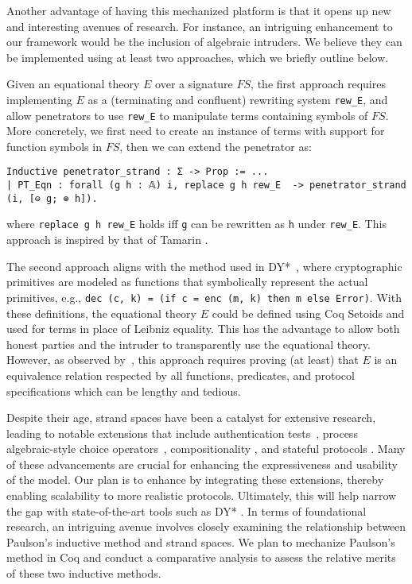 Another advantage of having this mechanized platform is that it opens up new and interesting avenues of research.
\ifdefined\COLORDIFF
    \color{cbred}
\else
\fi
For instance, an intriguing enhancement to our framework would be the inclusion of algebraic intruders. We believe they can be implemented using at least two approaches, which we briefly outline below.

Given an equational theory $E$ over a signature $\mathit{FS}$, the first approach requires implementing $E$ as a (terminating and confluent) rewriting system \lstinline{rew_E}, and allow penetrators to use \lstinline{rew_E} to manipulate terms containing symbols of $\mathit{FS}$.
More concretely, we first need to create an instance of \easystrands{} terms with support for function symbols in $\mathit{FS}$, then we can extend the penetrator as:
\begin{lstlisting}
Inductive penetrator_strand : Σ -> Prop := ...
| PT_Eqn : forall (g h : 𝔸) i, replace g h rew_E  -> penetrator_strand (i, [⊖ g; ⊕ h]).
\end{lstlisting}
where \lstinline{replace g h rew_E} holds iff \lstinline{g} can be rewritten as \lstinline{h} under \lstinline{rew_E}.
This approach is inspired by that of Tamarin \cite{MSCB13}.

The second approach aligns  with the method used in DY*~\cite{DY}, where cryptographic primitives are modeled as functions that symbolically represent the actual primitives, e.g., \lstinline{dec (c, k) = (if c = enc (m, k) then m else Error)}.
With these definitions, the equational theory $E$ could be defined using Coq Setoids and used for terms in place of Leibniz equality.
This has the advantage to allow both honest parties and the intruder to transparently use the equational theory.
However, as observed by~\citet{DY}, this approach requires proving (at least) that $E$ is an equivalence relation respected by all functions, predicates, and protocol specifications which can be lengthy and tedious.
\ifdefined\COLORDIFF
    \color{black}
\else
\fi

Despite their age, strand spaces have been a catalyst for extensive research, leading to notable extensions that include authentication tests~\cite{guttman2000authentication}, process algebraic-style choice operators~\cite{YEMMS16},
 compositionality \cite{StrandComposition,StrandIndependence,StrandMixed}, and stateful protocols \cite{J12}.
Many of these advancements are crucial for enhancing the expressiveness and usability of the model.
Our plan is to enhance \easystrands{} by integrating these extensions, thereby enabling scalability to more realistic protocols.
Ultimately, this will help narrow the gap with state-of-the-art tools such as DY* \cite{DY}.
In terms of foundational research, an intriguing avenue involves closely examining the relationship between Paulson's inductive method \cite{Paulson94} and strand spaces. We plan to mechanize Paulson's method in Coq and conduct a comparative analysis to assess the relative merits of these two inductive methods.

